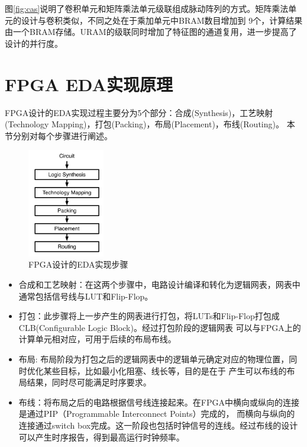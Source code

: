 图\ref{fig:cas}说明了卷积单元和矩阵乘法单元级联组成脉动阵列的方式。矩阵乘法单元的设计与卷积类似，不同之处在于乘加单元中BRAM数目增加到
9个，计算结果由一个BRAM存储。URAM的级联同时增加了特征图的通道复用，进一步提高了设计的并行度。

\section{FPGA EDA实现原理}

FPGA设计的EDA实现过程主要分为5个部分：合成(Synthesis)，工艺映射(Technology Mapping)，打包(Packing)，布局(Placement)，布线(Routing)。
本节分别对每个步骤进行阐述。
\begin{figure}[h]
	\centering
	\includegraphics[width=0.3\textwidth]{figure/cad}
	\caption{FPGA设计的EDA实现步骤} 
	\label{fig:eda}
\end{figure}
\begin{itemize}
    \item 合成和工艺映射：在这两个步骤中，电路设计编译和转化为逻辑网表，网表中通常包括信号线与LUT和Flip-Flop。
    \item 打包：此步骤将上一步产生的网表进行打包，将LUTs和Flip-Flop打包成CLB(Configurable Logic Block)。经过打包阶段的逻辑网表
    可以与FPGA上的计算单元相对应，可用于后续的布局布线。
    \item 布局: 布局阶段为打包之后的逻辑网表中的逻辑单元确定对应的物理位置，同时优化某些目标，比如最小化阻塞、线长等，目的是在于
    产生可以布线的布局结果，同时尽可能满足时序要求。
    \item 布线：将布局之后的电路根据信号线连接起来。在FPGA中横向或纵向的连接是通过PIP（Programmable Interconnect Points）完成的，
    而横向与纵向的连接通过switch box完成。这一阶段也包括时钟信号的连线。经过布线的设计可以产生时序报告，得到最高运行时钟频率。
\end{itemize}

